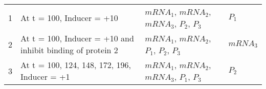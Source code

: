 

\begin{center}
\label{exp_table}
\begin{scriptsize}
\begin{supertabular}{|p{2cm}|p{5cm}|p{3cm}|p{3cm}|}  
 &  At t = 100, Inducer = +10 & $mRNA_{1}$, $mRNA_{2}$, $mRNA_{3}$, $P_{2}$, $P_{3}$ & $P_{1}$ \\
2 &  At t = 100, Inducer = +10 and inhibit binding of protein 2 &  $mRNA_{1}$, $mRNA_{2}$, $P_{1}$, $P_{2}$, $P_{3}$ & $mRNA_{3}$\\
3 &  At t = 100, 124, 148, 172, 196, Inducer = +1 &  $mRNA_{1}$, $mRNA_{2}$, $mRNA_{3}$, $P_{1}$, $P_{3}$ & $P_{2}$\\
\hline
\end{supertabular}
\end{scriptsize}
\end{center}
%
